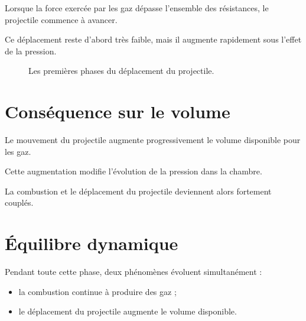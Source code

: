 Lorsque la force exercée par les gaz dépasse l'ensemble des résistances, le
projectile commence à avancer.

Ce déplacement reste d'abord très faible, mais il augmente rapidement sous
l'effet de la pression.

\begin{figure}[htbp]
\centering


\caption{Les premières phases du déplacement du projectile.}
\label{fig:debut_mouvement}

\end{figure}

\section{Conséquence sur le volume}

Le mouvement du projectile augmente progressivement le volume disponible pour
les gaz.

Cette augmentation modifie l'évolution de la pression dans la chambre.

La combustion et le déplacement du projectile deviennent alors fortement
couplés.

\section{Équilibre dynamique}

Pendant toute cette phase, deux phénomènes évoluent simultanément :

\begin{itemize}
    \item la combustion continue à produire des gaz ;
    \item le déplacement du projectile augmente le volume disponible.
\end{itemize}

